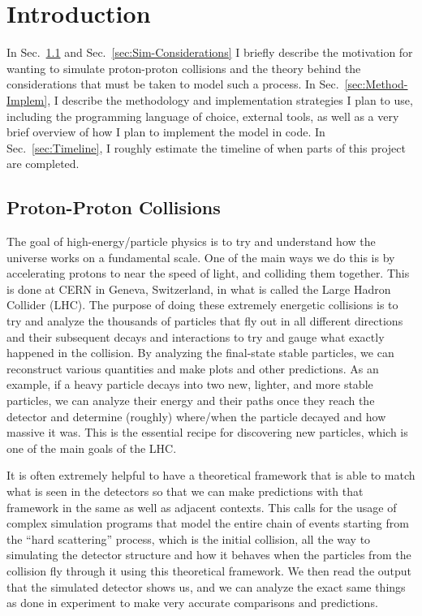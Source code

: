 \section{Introduction}

In Sec.~\ref{sec:PP-Collisions} and Sec.~\ref{sec:Sim-Considerations} I briefly describe the motivation for wanting to simulate proton-proton collisions and the theory behind the considerations that must be taken to model such a process. In Sec.~\ref{sec:Method-Implem}, I describe the methodology and implementation strategies I plan to use, including the programming language of choice, external tools, as well as a very brief overview of how I plan to implement the model in code. In Sec.~\ref{sec:Timeline}, I roughly estimate the timeline of when parts of this project are completed.


\subsection{Proton-Proton Collisions}\label{sec:PP-Collisions}

The goal of high-energy/particle physics is to try and understand how the universe works on a fundamental scale. One of the main ways we do this is by accelerating protons to near the speed of light, and colliding them together. This is done at CERN in Geneva, Switzerland, in what is called the Large Hadron Collider (LHC). The purpose of doing these extremely energetic collisions is to try and analyze the thousands of particles that fly out in all different directions and their subsequent decays and interactions to try and gauge what exactly happened in the collision. By analyzing the final-state stable particles, we can reconstruct various quantities and make plots and other predictions. As an example, if a heavy particle decays into two new, lighter, and more stable particles, we can analyze their energy and their paths once they reach the detector and determine (roughly) where/when the particle decayed and how massive it was. This is the essential recipe for discovering new particles, which is one of the main goals of the LHC.

It is often extremely helpful to have a theoretical framework that is able to match what is seen in the detectors so that we can make predictions with that framework in the same as well as adjacent contexts. This calls for the usage of complex simulation programs that model the entire chain of events starting from the ``hard scattering'' process, which is the initial collision, all the way to simulating the detector structure and how it behaves when the particles from the collision fly through it using this theoretical framework. We then read the output that the simulated detector shows us, and we can analyze the exact same things as done in experiment to make very accurate comparisons and predictions.


